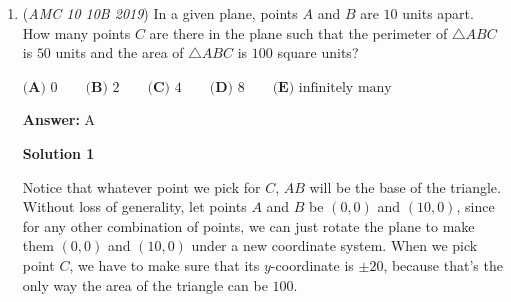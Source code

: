 \begin{enumerate}
 Therefore the only two possible values for $f(x)$, and thus the range of the function, is $\boxed{\textbf{(A) } \{-1, 0\}}$.

 



\textbf{Solution 4}

We have 2 cases: either $x$ is positive or $x$ is negative.

 
\textbf{Case 1 - x is positive:}

 Let $x = n + f$, where $n$ is a positive integer and $f$ is a positive real number between 0 and 1. We have
 \[\lfloor |x| \rfloor = \lfloor |n+f| \rfloor = \lfloor n+f \rfloor = n\] and
 \[|\lfloor x \rfloor| = |\lfloor n+f \rfloor| = |n| = n.\] $n-n=0$, so the possible value of $f(x)$ if $x$ is positive is $0$. 

 
\textbf{Case 2 - x is negative: }

 Let $x = -n - f$, where $n$ is a positive integer and $f$ is a positive real number between 0 and 1. We have
 \[\lfloor |x| \rfloor = \lfloor |-n-f| \rfloor = \lfloor n+f \rfloor = n\] and
 \[|\lfloor x \rfloor| = |\lfloor -n-f \rfloor| =|-n|\:or\: |-n-1|= n \:or\: n+1.\]
$n-n=0$ and $n-(n+1) = -1$, so the possible values of $f(x)$ if $x$ is negative are $0$ and $-1.$ 

 
Hence, the possible values of $f(x)$ are $0$ and $-1$, so the answer is $\boxed{\textbf{(A) } \{-1, 0\}}$. ~azc1027

 


	\item (\textit{AMC 10 10B 2019}) In a given plane, points $A$ and $B$ are $10$ units apart. How many points $C$ are there in the plane such that the perimeter of $\triangle ABC$ is $50$ units and the area of $\triangle ABC$ is $100$ square units?


 $\textbf{(A) }0\qquad\textbf{(B) }2\qquad\textbf{(C) }4\qquad\textbf{(D) }8\qquad\textbf{(E) }\text{infinitely many}$

 \textbf{Answer: }A



\textbf{Solution 1}

Notice that whatever point we pick for $C$, $AB$ will be the base of the triangle. Without loss of generality, let points $A$ and $B$ be $(0,0)$ and $(10,0)$, since for any other combination of points, we can just rotate the plane to make them $(0,0)$ and $(10,0)$ under a new coordinate system. When we pick point $C$, we have to make sure that its $y$-coordinate is $\pm20$, because that's the only way the area of the triangle can be $100$. 


\end{enumerate}
